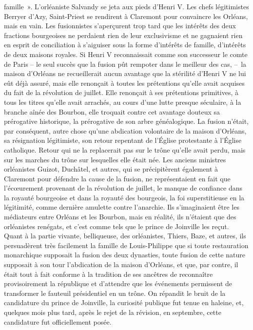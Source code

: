 \documentclass[french,twoside]{book} %
\begin{document}
famille ». L’orléaniste Salvandy se jeta aux pieds d’Henri V. Les chefs légitimistes Berryer d’Azy, Saint-Priest se rendirent à Claremont pour convaincre les Orléans, mais en vain. Les fusionnistes s’aperçurent trop tard que les intérêts des deux fractions bourgeoises ne perdaient rien de leur exclusivisme et ne gagnaient rien en esprit de conciliation à s’aiguiser sous la forme d’intérêts de famille, d’intérêts de deux maisons royales. Si Henri V reconnaissait comme son successeur le comte de Paris – le seul succès que la fusion pût rempoter dans le meilleur des cas, – la maison d’Orléans ne recueillerait aucun avantage que la stérilité d’Henri V ne lui eût déjà assuré, mais elle renonçait à toutes les prétentions qu’elle avait acquises du fait de la révolution de juillet. Elle renonçait à ses prétentions primitives, à tous les titres qu’elle avait arrachés, au cours d’une lutte presque séculaire, à la branche aînée des Bourbon, elle troquait contre cet avantage douteux sa prérogative historique, la prérogative de son arbre généalogique. La fusion n’était, par conséquent, autre chose qu’une abdication volontaire de la maison d’Orléans, sa résignation légitimiste, son retour repentant de l’Église protestante à l’Église catholique. Retour qui ne la replacerait pas sur le trône qu’elle avait perdu, mais sur les marches du trône sur lesquelles elle était née. Les anciens ministres orléanistes Guizot, Duchâtel, et autres, qui se précipitèrent également à Claremont pour défendre la cause de la fusion, ne représentaient en fait que l’écœurement provenant de la révolution de juillet, le manque de confiance dans la royauté bourgeoise et dans la royauté des bourgeois, la foi superstitieuse en la légitimité, comme dernière amulette contre l’anarchie. Ils s’imaginaient être les médiateurs entre Orléans et les Bourbon, mais en réalité, ils n’étaient que des orléanistes renégats, et c’est comme tels que le prince de Joinville les reçut. Quant à la partie vivante, belliqueuse, des orléanistes, Thiers, Baze, et autres, ils persuadèrent très facilement la famille de Louis-Philippe que si toute restauration monarchique supposait la fusion des deux dynasties, toute fusion de cette nature supposait à son tour l’abdication de la maison d’Orléans, et que, par contre, il était tout à fait conforme à la tradition de ses ancêtres de reconnaître provisoirement la république et d’attendre que les événements permissent de transformer le fauteuil présidentiel en un trône. On répandit le bruit de la candidature du prince de Joinville, la curiosité publique fut tenue en haleine, et, quelques mois plus tard, après le rejet de la révision, en septembre, cette candidature fut officiellement posée.\par
\end{document}
